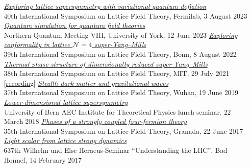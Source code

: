 \begin{spacelist}
\begin{revnumerate}
%
%
%
\vspace{18 pt}
\hspace{-22 pt}{\large \bfseries Contributed talks} \vspace{-8 pt}
    \pagebreakitem
      \textit{\href{http://www.davidschaich.net/talks/2308Lattice.pdf}{Exploring lattice supersymmetry with variational quantum deflation}} \\
      40th International Symposium on Lattice Field Theory, Fermilab, 3 August 2023
    \pagebreakitem
      \textit{\href{http://www.davidschaich.net/talks/2306NQM.pdf}{Quantum simulation for quantum field theories}} \\
      Northern Quantum Meeting VIII, University of York, 12 June 2023
    \pagebreakitem
      \textit{\href{http://www.davidschaich.net/talks/2208Lattice.pdf}{Exploring conformality in lattice $\mathcal N = 4$ super-Yang--Mills}} \\
      39th International Symposium on Lattice Field Theory, Bonn, 8 August 2022
    \pagebreakitem
      \textit{\href{http://www.davidschaich.net/talks/2107Lattice.pdf}{Thermal phase structure of dimensionally reduced super-Yang--Mills}} \\
      38th International Symposium on Lattice Field Theory, MIT, 29 July 2021 [\href{https://mit.hosted.panopto.com/Panopto/Pages/Viewer.aspx?id=64ee6f58-a5fb-4c8d-89d6-ad7401401fc2}{recording}]
    \pagebreakitem
      \textit{\href{http://www.davidschaich.net/talks/1906Lattice.pdf}{Stealth dark matter and gravitational waves}} \\
      37th International Symposium on Lattice Field Theory, Wuhan, 19 June 2019
    \pagebreakitem
      \textit{\href{http://www.davidschaich.net/talks/1803Bern.pdf}{Lower-dimensional lattice supersymmetry}} \\
      University of Bern AEC Institute for Theoretical Physics lunch seminar, 22 March 2018
    \pagebreakitem
      \textit{\href{http://www.davidschaich.net/talks/lattice17.pdf}{Phases of a strongly coupled four-fermion theory}} \\
      35th International Symposium on Lattice Field Theory, Granada, 22 June 2017
    \pagebreakitem
      \textit{\href{http://www.davidschaich.net/talks/1702BadHonnef.pdf}{Light scalar from lattice strong dynamics}} \\
      637th Wilhelm und Else Heraeus-Seminar ``Understanding the LHC'', Bad Honnef, 14 February 2017

\end{revnumerate}
\end{spacelist}
